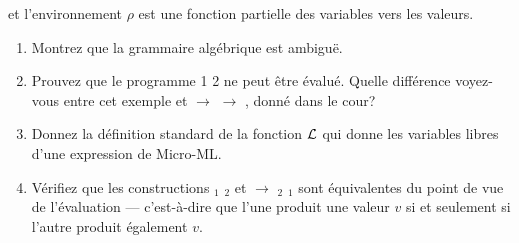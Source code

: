 \documentclass[11pt,a4paper]{article}
\begin{document}
\noindent et l'environnement $\rho$ est une fonction partielle des
variables vers les valeurs.

\begin{enumerate}

  \item Montrez que la grammaire algébrique est ambiguë.

  \item Prouvez que le programme \textsf{1 2} ne peut être
  évalué. Quelle différence voyez-vous entre cet exemple et
  \lpar{}  $\rightarrow$  \rpar{}
  \lpar{}  $\rightarrow$  \rpar,
  donné dans le cour?

  \item Donnez la définition standard de la fonction ${\cal L}$ qui
  donne les variables libres d'une expression de Micro-ML.

  \item \label{q\theenumi} Vérifiez que les constructions 
     \equal{} $_1$  $_2$ et
    \lpar{}  $\rightarrow$ $_2$\rpar{}
    $_1$ sont équivalentes du point de vue de l'évaluation
    --- c'est-à-dire que l'une produit une valeur $v$ si et seulement
    si l'autre produit également $v$.

\end{enumerate}
\end{document}
